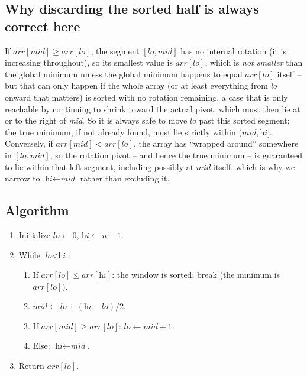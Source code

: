 \subsection*{Why discarding the sorted half is always correct here}

If $\textit{arr}[\textit{mid}] \ge \textit{arr}[\textit{lo}]$, the segment
$[\textit{lo}, \textit{mid}]$ has no internal rotation (it is increasing
throughout), so its smallest value is $\textit{arr}[\textit{lo}]$, which is
\emph{not smaller} than the global minimum unless the global minimum
happens to equal $\textit{arr}[\textit{lo}]$ itself -- but that can only
happen if the whole array (or at least everything from \textit{lo} onward
that matters) is sorted with no rotation remaining, a case that is only
reachable by continuing to shrink toward the actual pivot, which must then
lie at or to the right of \textit{mid}. So it is always safe to move
$\textit{lo}$ past this sorted segment; the true minimum, if not already
found, must lie strictly within $(\textit{mid}, \textit{hi}]$. Conversely,
if $\textit{arr}[\textit{mid}] < \textit{arr}[\textit{lo}]$, the array has
``wrapped around'' somewhere in $[\textit{lo}, \textit{mid}]$, so the
rotation pivot -- and hence the true minimum -- is guaranteed to lie within
that left segment, including possibly at $\textit{mid}$ itself, which is
why we narrow to $\textit{hi} \gets \textit{mid}$ rather than excluding it.

\subsection*{Algorithm}

\begin{enumerate}
  \item Initialize $\textit{lo} \gets 0$, $\textit{hi} \gets n-1$.
  \item While $\textit{lo} < \textit{hi}$:
  \begin{enumerate}
    \item If $\textit{arr}[\textit{lo}] \le \textit{arr}[\textit{hi}]$:
          the window is sorted; break (the minimum is
          $\textit{arr}[\textit{lo}]$).
    \item $\textit{mid} \gets \textit{lo}+(\textit{hi}-\textit{lo})/2$.
    \item If $\textit{arr}[\textit{mid}] \ge \textit{arr}[\textit{lo}]$:
          $\textit{lo} \gets \textit{mid}+1$.
    \item Else: $\textit{hi} \gets \textit{mid}$.
  \end{enumerate}
  \item Return $\textit{arr}[\textit{lo}]$.
\end{enumerate}

